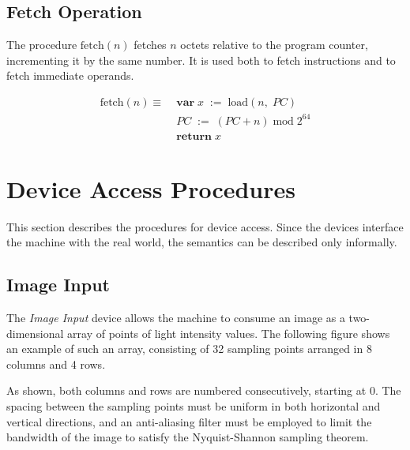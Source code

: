 \documentclass[a4paper,10pt]{article}
\newcommand{\PC}{PC}
\newcommand{\set}[2]{#1\;:=\;#2}
\newcommand{\Var}[2]{\mathbf{var}\;#1\;:=\;#2\;}
\newcommand{\return}[1]{\mathbf{return} \; #1}
\newcommand{\Get}[2]{\mathrm{load}(#1,\;#2)}
\newcommand{\Fetch}[1]{\mathrm{fetch}(#1)}
\DeclareMathOperator{\Mod}{mod}
\newcommand{\modulo}[2]{#1 \Mod #2}
\theoremstyle{definition}
\begin{document}
\subsection{Fetch Operation}

The procedure $\Fetch{n}$ fetches $n$ octets relative to the program counter, incrementing it by the same number.
It is used both to fetch instructions and to fetch immediate operands.

\begin{equation}
  \begin{split}
    \Fetch{n} \equiv \; & \Var{x}{\Get{n}{\PC}} \\
    & \set{\PC}{\modulo{(\PC+n)}{2^{64}}} \\
    & \return{x}
  \end{split}
\end{equation}

\section{Device Access Procedures}

This section describes the procedures for device access.
Since the devices interface the machine with the real world, the semantics can be described only informally.

\subsection{Image Input}
\label{sec:image-input}
The \emph{Image Input} device allows the machine to consume an image as a two-dimensional array of points of light intensity values.
The following figure shows an example of such an array, consisting of 32 sampling points arranged in 8 columns and 4 rows.
\begin{center}
\end{center}
As shown, both columns and rows are numbered consecutively, starting at 0.
The spacing between the sampling points must be uniform in both horizontal and vertical directions, and an anti-aliasing filter must be employed to limit the bandwidth of the image to satisfy the Nyquist-Shannon sampling theorem.
\end{document}
